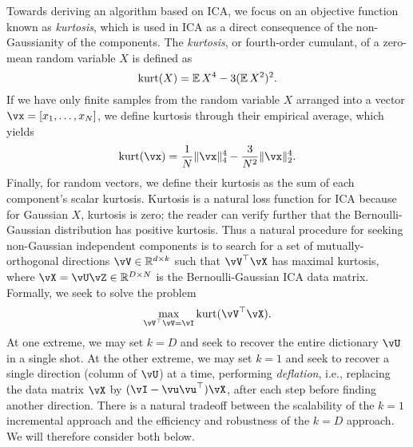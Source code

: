 \documentclass[\toplevelprefix/book-main.tex]{subfiles}
\begin{document}
Towards deriving an algorithm based on ICA, we focus on an objective function known as \textit{kurtosis}, which is used in ICA as a direct consequence of the non-Gaussianity of the components. The \textit{kurtosis}, or fourth-order cumulant, of a zero-mean random variable $X$ is defined as
\begin{equation}\label{eq:kurtosis}
\mathop{\mathrm{kurt}}(X) = \operatorname{\mathbb{E}}{X^4} - 3 (\operatorname{\mathbb{E}}{X^2})^2.
\end{equation}
If we have only finite samples from the random variable $X$ arranged into a vector $\vx = [x_1, \dots, x_N]$, we define kurtosis through their empirical average, which yields
\begin{equation}\label{eq:kurtosis-vector}
\kurt(\vx) = \frac{1}{N} \norm{\vx}_4^4 - \frac{3}{N^2} \norm{\vx}_2^4.
\end{equation}
Finally, for random vectors, we define their kurtosis as the sum of each component's scalar kurtosis.
Kurtosis is a natural loss function for ICA because for Gaussian $X$, kurtosis is zero; the reader can verify further that the Bernoulli-Gaussian distribution has positive kurtosis. 
Thus a natural procedure for seeking non-Gaussian independent components is to search for a set of mutually-orthogonal directions $\vV \in \R^{d \times k}$ such that $\vV^\top \vX$ has maximal kurtosis, where $\vX = \vU \vZ \in \R^{D \times N}$ is the Bernoulli-Gaussian ICA data matrix.
Formally, we seek to solve the problem
\begin{equation}
    \max_{\vV^\top \vV = \vI} \kurt(\vV^\top \vX).
\end{equation}
At one extreme, we may set $k = D$ and seek to recover the entire dictionary $\vU$ in a single shot.  At the other extreme, we may set $k=1$ and seek to recover a single direction (column of $\vU$) at a time, performing \textit{deflation}, i.e., replacing the data matrix $\vX$ by $(\vI - \vu\vu^\top) \vX$, after each step before finding another direction.
There is a natural tradeoff between the scalability of the $k=1$ incremental approach and the efficiency and robustness of the $k=D$ approach. We will therefore consider both below.
\end{document}
